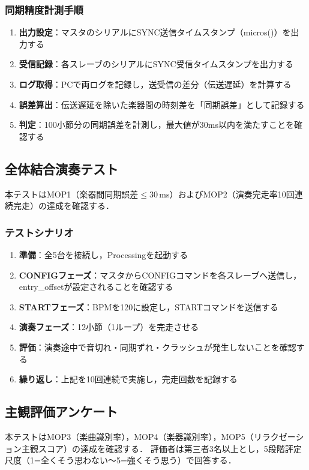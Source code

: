 \documentclass[lualatex,book,paper=a4paper,jafontsize=11.5pt,jafontscale=1.05]{jlreq}
\begin{document}
\subsubsection{同期精度計測手順}
\begin{enumerate}
  \item \textbf{出力設定}：マスタのシリアルにSYNC送信タイムスタンプ（micros()）を出力する
  \item \textbf{受信記録}：各スレーブのシリアルにSYNC受信タイムスタンプを出力する
  \item \textbf{ログ取得}：PCで両ログを記録し，送受信の差分（伝送遅延）を計算する
  \item \textbf{誤差算出}：伝送遅延を除いた楽器間の時刻差を「同期誤差」として記録する
  \item \textbf{判定}：100小節分の同期誤差を計測し，最大値が30ms以内を満たすことを確認する
\end{enumerate}

\subsection{全体結合演奏テスト}
本テストはMOP1（楽器間同期誤差$\leq 30$\,ms）およびMOP2（演奏完走率10回連続完走）の達成を確認する．

\subsubsection{テストシナリオ}
\begin{enumerate}
  \item \textbf{準備}：全5台を接続し，Processingを起動する
  \item \textbf{CONFIGフェーズ}：マスタからCONFIGコマンドを各スレーブへ送信し，entry\_offsetが設定されることを確認する
  \item \textbf{STARTフェーズ}：BPMを120に設定し，STARTコマンドを送信する
  \item \textbf{演奏フェーズ}：12小節（1ループ）を完走させる
  \item \textbf{評価}：演奏途中で音切れ・同期ずれ・クラッシュが発生しないことを確認する
  \item \textbf{繰り返し}：上記を10回連続で実施し，完走回数を記録する
\end{enumerate}

\subsection{主観評価アンケート}
本テストはMOP3（楽曲識別率），MOP4（楽器識別率），MOP5（リラクゼーション主観スコア）の達成を確認する．
評価者は第三者3名以上とし，5段階評定尺度（1=全くそう思わない〜5=強くそう思う）で回答する．
\end{document}
